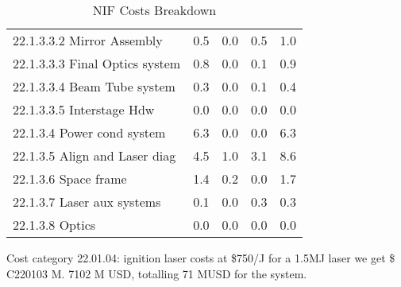 \begin{table}[h!]
{\begin{tabular}{lcccc}
\hspace{10mm}22.1.3.3.2 Mirror Assembly & 0.5 & 0.0 & 0.5 & 1.0 \\
\hspace{10mm}22.1.3.3.3 Final Optics system & 0.8 & 0.0 & 0.1 & 0.9 \\
\hspace{10mm}22.1.3.3.4 Beam Tube system & 0.3 & 0.0 & 0.1 & 0.4 \\
\hspace{10mm}22.1.3.3.5 Interstage Hdw & 0.0 & 0.0 & 0.0 & 0.0 \\
\hspace{5mm}22.1.3.4 Power cond system & 6.3 & 0.0 & 0.0 & 6.3 \\
\hspace{5mm}22.1.3.5 Align and Laser diag & 4.5 & 1.0 & 3.1 & 8.6 \\
\hspace{5mm}22.1.3.6 Space frame & 1.4 & 0.2 & 0.0 & 1.7 \\
\hspace{5mm}22.1.3.7 Laser aux systems & 0.1 & 0.0 & 0.3 & 0.3 \\
\hspace{5mm}22.1.3.8 Optics & 0.0 & 0.0 & 0.0 & 0.0 \\
\hline
\end{tabular}}
\caption{NIF Costs Breakdown}
\label{tab:nif_costs}
\end{table}



Cost category 22.01.04: ignition laser costs at  \$750/J for a 1.5MJ laser we get \$ C220103 M. 7102 M USD, totalling 71 MUSD for the system.



